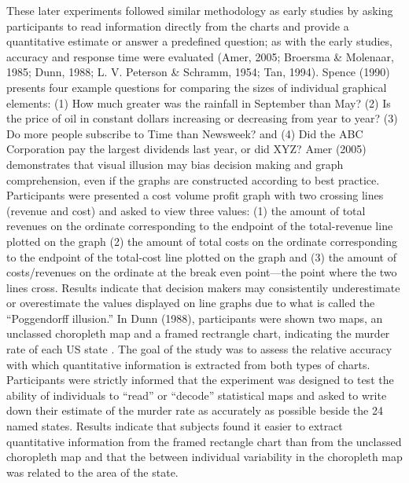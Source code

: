 \documentclass[print]{nuthesis}
\begin{document}
These later experiments followed similar methodology as early studies by asking participants to read information directly from the charts and provide a quantitative estimate or answer a predefined question; as with the early studies, accuracy and response time were evaluated (Amer, 2005; Broersma \& Molenaar, 1985; Dunn, 1988; L. V. Peterson \& Schramm, 1954; Tan, 1994).
Spence (1990) presents four example questions for comparing the sizes of individual graphical elements: (1) How much greater was the rainfall in September than May? (2) Is the price of oil in constant dollars increasing or decreasing from year to year? (3) Do more people subscribe to Time than Newsweek? and (4) Did the ABC Corporation pay the largest dividends last year, or did XYZ?
Amer (2005) demonstrates that visual illusion may bias decision making and graph comprehension, even if the graphs are constructed according to best practice.
Participants were presented a cost volume profit graph  with two crossing lines (revenue and cost) and asked to view three values: (1) the amount of total revenues on the ordinate corresponding to the endpoint of the total-revenue line plotted on the graph (2) the amount of total costs on the ordinate corresponding to the endpoint of the total-cost line plotted on the graph and (3) the amount of costs/revenues on the ordinate at the break even point---the point where the two lines cross.
Results indicate that decision makers may consistentily underestimate or overestimate the values displayed on line graphs due to what is called the ``Poggendorff illusion.''
In Dunn (1988), participants were shown two maps, an unclassed choropleth map and a framed rectrangle chart, indicating the murder rate of each US state .
The goal of the study was to assess the relative accuracy with which quantitative information is extracted from both types of charts.
Participants were strictly informed that the experiment was designed to test the ability of individuals to ``read'' or ``decode'' statistical maps and asked to write down their estimate of the murder rate as accurately as possible beside the 24 named states.
Results indicate that subjects found it easier to extract quantitative information from the framed rectangle chart than from the unclassed choropleth map and that the between individual variability in the choropleth map was related to the area of the state.
\end{document}
